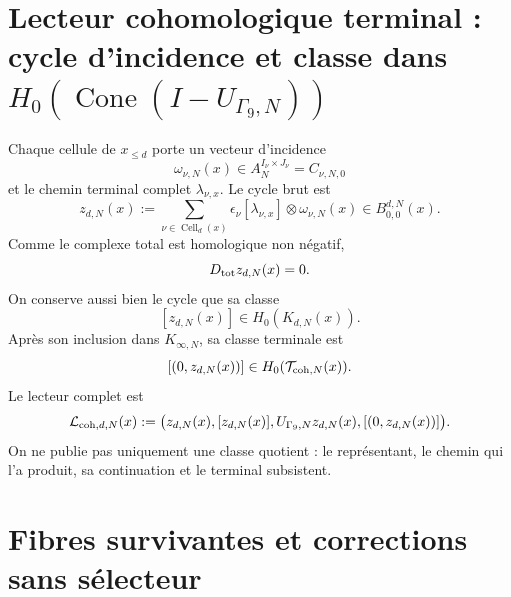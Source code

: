 \section{Lecteur cohomologique terminal : cycle d'incidence et classe dans \(H_0(\operatorname{Cone}(I-U_{\Gamma_9,N}))\)}
\label{sec:pdfv2-coh-reader}

Chaque cellule de \(x_{\leq d}\) porte un vecteur d'incidence
\[
 \omega_{\nu,N}(x)
 \in A_N^{I_\nu\times J_\nu}=C_{\nu,N,0}
\]
et le chemin terminal complet \(\lambda_{\nu,x}\). Le cycle brut est
\begin{equation}\label{eq:pdfv2-coh-z-cycle}
 z_{d,N}(x):=
 \sum_{\nu\in\operatorname{Cell}_d(x)}
 \epsilon_\nu[\lambda_{\nu,x}]
 \otimes\omega_{\nu,N}(x)
 \in B_{0,0}^{d,N}(x).
\end{equation}
Comme le complexe total est homologique non négatif,
\begin{equation}\label{eq:pdfv2-coh-z-closed}
 D_{\rm tot}z_{d,N}(x)=0.
\end{equation}
On conserve aussi bien le cycle que sa classe
\[
 [z_{d,N}(x)]\in H_0(K_{d,N}(x)).
\]
Après son inclusion dans \(K_{\infty,N}\), sa classe terminale est
\[
 [(0,z_{d,N}(x))]
 \in H_0(\mathcal T_{{\rm coh},N}(x)).
\]
Le lecteur complet est
\begin{equation}\label{eq:pdfv2-coh-reader-full}
 \mathcal L_{{\rm coh},d,N}(x)
 :=\bigl(
 z_{d,N}(x),[z_{d,N}(x)],
 U_{\Gamma_9,N}z_{d,N}(x),
 [(0,z_{d,N}(x))]
 \bigr).
\end{equation}
On ne publie pas uniquement une classe quotient : le représentant, le
chemin qui l'a produit, sa continuation et le terminal subsistent.

\section{Fibres survivantes et corrections sans sélecteur}
\label{sec:pdfv2-coh-surviving-fibers}

